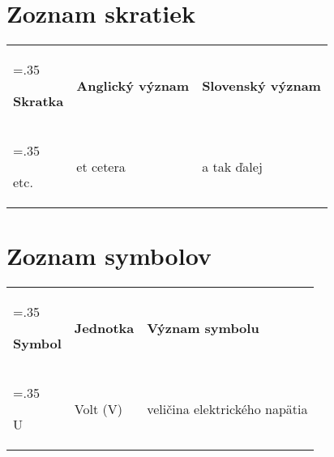 \newpage %
\section*{Zoznam skratiek}

\begin{tabularx}{\textwidth}{
		>{\hsize=.35\hsize\raggedright\arraybackslash}X
		>{\raggedright\arraybackslash}X
		>{\raggedright\arraybackslash}X}
	\textbf{Skratka} & \textbf{Anglický význam} & \textbf{Slovenský význam} \\
	etc. & et cetera & a tak ďalej
\end{tabularx}

\section*{Zoznam symbolov}

\begin{tabularx}{\textwidth}{
		>{\hsize=.35\hsize\raggedright\arraybackslash}X
		>{\raggedright\arraybackslash}X
		>{\raggedright\arraybackslash}X}
	\textbf{Symbol} & \textbf{Jednotka} & \textbf{Význam symbolu} \\
	U & Volt (V) & veličina elektrického napätia
\end{tabularx}